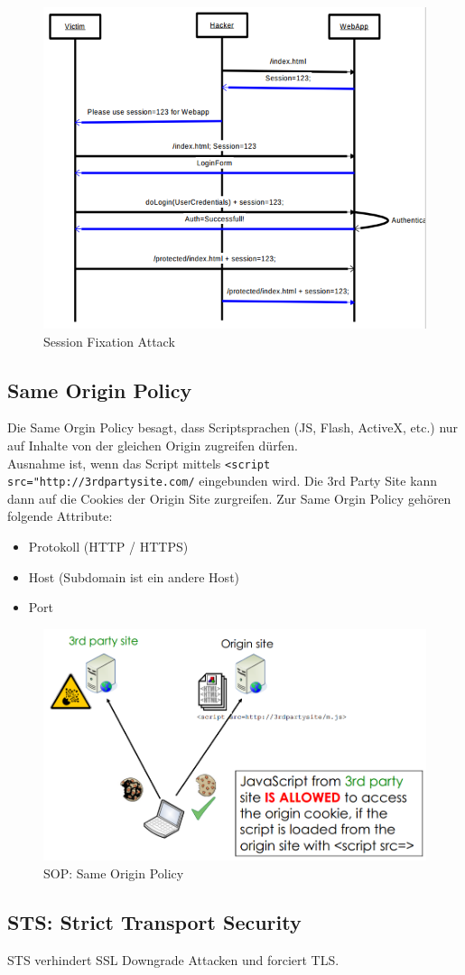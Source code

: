 \begin{figure}[h!]
	\centering
	\includegraphics[width=0.5\linewidth]{images/session_fixation}
	\caption{Session Fixation Attack}
	\label{fig:sessionfixation}
\end{figure}



\subsection{Same Origin Policy}
Die Same Orgin Policy besagt, dass Scriptsprachen (JS, Flash, ActiveX, etc.) nur auf Inhalte von der gleichen Origin zugreifen dürfen. \\
Ausnahme ist, wenn das Script mittels \lstinline|<script src="http://3rdpartysite.com/| eingebunden wird. Die 3rd Party Site kann dann auf die Cookies der Origin Site zurgreifen.
Zur Same Orgin Policy gehören folgende Attribute:
\begin{itemize}
	\item Protokoll (HTTP / HTTPS)
	\item Host (Subdomain ist ein andere Host)
	\item Port
\end{itemize}

\begin{figure}
	\centering
	\includegraphics[width=0.5\linewidth]{images/sop}
	\caption{SOP: Same Origin Policy}
	\label{fig:sop}
\end{figure}


\subsection{STS: Strict Transport Security}
STS verhindert SSL Downgrade Attacken und forciert TLS. 


